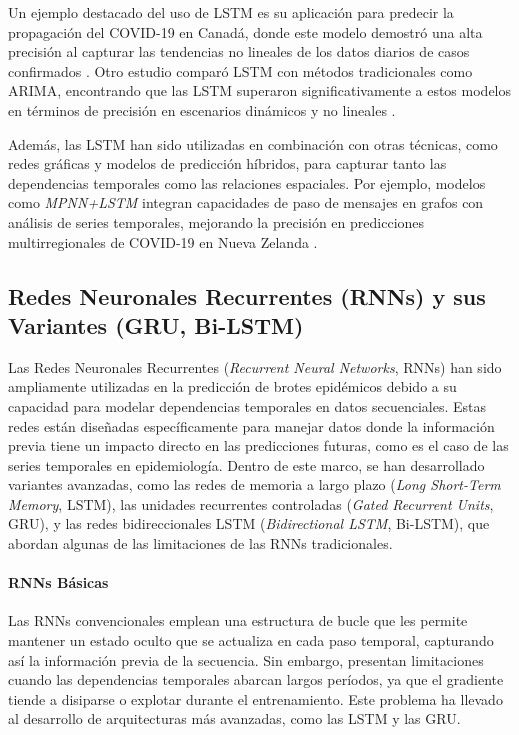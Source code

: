 Un ejemplo destacado del uso de LSTM es su aplicación para predecir la propagación del COVID-19 en Canadá, donde este modelo demostró una alta precisión al capturar las tendencias no lineales de los datos diarios de casos confirmados \cite{Chimmula2020}. Otro estudio comparó LSTM con métodos tradicionales como ARIMA, encontrando que las LSTM superaron significativamente a estos modelos en términos de precisión en escenarios dinámicos y no lineales \cite{AutoSEIR2020, Baccega2024}. 

Además, las LSTM han sido utilizadas en combinación con otras técnicas, como redes gráficas y modelos de predicción híbridos, para capturar tanto las dependencias temporales como las relaciones espaciales. Por ejemplo, modelos como \textit{MPNN+LSTM} integran capacidades de paso de mensajes en grafos con análisis de series temporales, mejorando la precisión en predicciones multirregionales de COVID-19 en Nueva Zelanda \cite{Nguyen2023}.

\subsection{Redes Neuronales Recurrentes (RNNs) y sus Variantes (GRU, Bi-LSTM)}

Las Redes Neuronales Recurrentes (\textit{Recurrent Neural Networks}, RNNs) han sido ampliamente utilizadas en la predicción de brotes epidémicos debido a su capacidad para modelar dependencias temporales en datos secuenciales. Estas redes están diseñadas específicamente para manejar datos donde la información previa tiene un impacto directo en las predicciones futuras, como es el caso de las series temporales en epidemiología. Dentro de este marco, se han desarrollado variantes avanzadas, como las redes de memoria a largo plazo (\textit{Long Short-Term Memory}, LSTM), las unidades recurrentes controladas (\textit{Gated Recurrent Units}, GRU), y las redes bidireccionales LSTM (\textit{Bidirectional LSTM}, Bi-LSTM), que abordan algunas de las limitaciones de las RNNs tradicionales.

\paragraph{RNNs Básicas}
Las RNNs convencionales emplean una estructura de bucle que les permite mantener un estado oculto que se actualiza en cada paso temporal, capturando así la información previa de la secuencia. Sin embargo, presentan limitaciones cuando las dependencias temporales abarcan largos períodos, ya que el gradiente tiende a disiparse o explotar durante el entrenamiento. Este problema ha llevado al desarrollo de arquitecturas más avanzadas, como las LSTM y las GRU.

